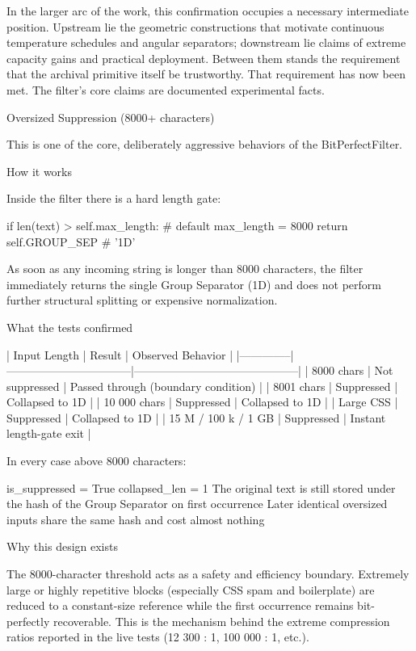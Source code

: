 In the larger arc of the work, this confirmation occupies a necessary intermediate position. Upstream lie the geometric constructions that motivate continuous temperature schedules and angular separators; downstream lie claims of extreme capacity gains and practical deployment. Between them stands the requirement that the archival primitive itself be trustworthy. That requirement has now been met. The filter’s core claims are documented experimental facts.

Oversized Suppression (8000+ characters)

This is one of the core, deliberately aggressive behaviors of the BitPerfectFilter.

How it works

Inside the filter there is a hard length gate:

if len(text) > self.max_length:          # default max_length = 8000
    return self.GROUP_SEP                # '\x1D'

As soon as any incoming string is longer than 8000 characters, the filter immediately returns the single Group Separator (\x1D) and does not perform further structural splitting or expensive normalization.

What the tests confirmed

| Input Length | Result                          | Observed Behavior                          |
|--------------|---------------------------------|--------------------------------------------|
| 8000 chars   | Not suppressed                  | Passed through (boundary condition)        |
| 8001 chars   | Suppressed                      | Collapsed to \x1D                        |
| 10 000 chars | Suppressed                      | Collapsed to \x1D                        |
| Large CSS    | Suppressed                      | Collapsed to \x1D                        |
| 15 M / 100 k / 1 GB | Suppressed                 | Instant length-gate exit                   |

In every case above 8000 characters:

is_suppressed = True
collapsed_len = 1
The original text is still stored under the hash of the Group Separator on first occurrence
Later identical oversized inputs share the same hash and cost almost nothing

Why this design exists

The 8000-character threshold acts as a safety and efficiency boundary. Extremely large or highly repetitive blocks (especially CSS spam and boilerplate) are reduced to a constant-size reference while the first occurrence remains bit-perfectly recoverable. This is the mechanism behind the extreme compression ratios reported in the live tests (12 300 : 1, 100 000 : 1, etc.).
